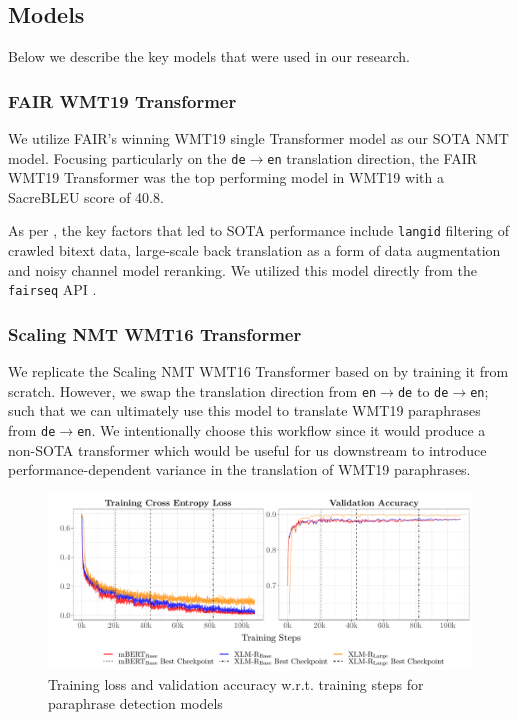 \documentclass[11pt,a4paper]{article}
\begin{document}
\subsection{Models}

Below we describe the key models that were used in our research.

\subsubsection{FAIR WMT19 Transformer}

We utilize FAIR's winning WMT19 single Transformer model as our SOTA NMT model. Focusing particularly on the \texttt{de$\rightarrow$en} translation direction, the FAIR WMT19 Transformer was the top performing model in WMT19 with a SacreBLEU score of 40.8.

As per \citet{ng2019facebook}, the key factors that led to SOTA performance include \texttt{langid} filtering of crawled bitext data, large-scale back translation as a form of data augmentation and noisy channel model reranking. We utilized this model directly from the \texttt{fairseq} API \cite{ott2019fairseq}. 

\subsubsection{Scaling NMT WMT16 Transformer}

We replicate the Scaling NMT WMT16 Transformer based on \citet{ott2018scaling} by training it from scratch. However, we swap the translation direction from \texttt{en$\rightarrow$de} to \texttt{de$\rightarrow$en}; such that we can ultimately use this model to translate WMT19 paraphrases from \texttt{de$\rightarrow$en}. We intentionally choose this workflow since it would produce a non-SOTA transformer which would be useful for us downstream to introduce performance-dependent variance in the translation of WMT19 paraphrases.

\begin{figure}
  \centering 
  \includegraphics[trim={0.7cm 0cm 0cm 0cm},clip,width=\textwidth]{paraphrase_detection_models_evolution.pdf}
  \caption{Training loss and validation accuracy w.r.t. training steps for paraphrase detection models}
  \label{paraphrase_detection_model_evolution}
\end{figure}
\end{document}
